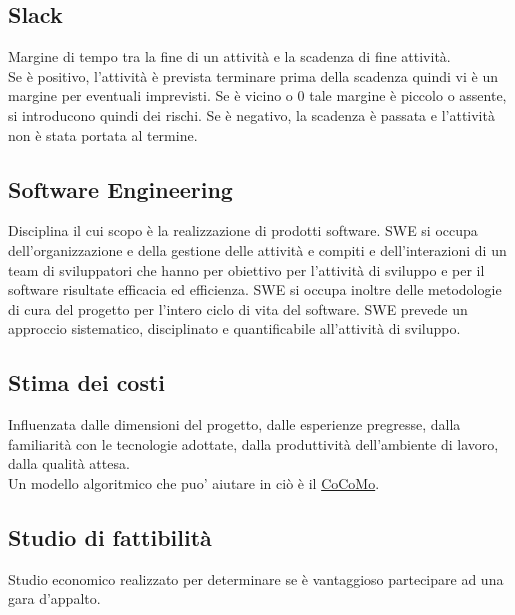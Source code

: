 	\subsection{Slack}
	\label{sec:slack}
	Margine di tempo tra la fine di un attività e la scadenza di fine attività. \\
	Se è positivo, l'attività è prevista terminare prima della scadenza quindi vi è un margine per eventuali imprevisti. Se è vicino o 0 tale margine è piccolo o assente, si introducono quindi dei rischi. Se è negativo, la scadenza è passata e l'attività non è stata portata al termine.
	
	\subsection{Software Engineering}
	\label{sec:swe}
	Disciplina il cui scopo è la realizzazione di prodotti software.
	SWE si occupa dell'organizzazione e della gestione delle attività e compiti e dell'interazioni di un team di sviluppatori
	che hanno per obiettivo per l'attività di sviluppo e per il software risultate efficacia ed efficienza.	
	SWE si occupa inoltre delle metodologie di cura del progetto per l'intero ciclo di vita del software.
	SWE prevede un approccio sistematico, disciplinato e quantificabile all'attività di sviluppo.

	\subsection{Stima dei costi}
	\label{sec:stimacosti}
	Influenzata dalle dimensioni del progetto, dalle esperienze pregresse, dalla familiarità con le tecnologie adottate, dalla produttività dell'ambiente di lavoro, dalla qualità attesa. \\Un modello algoritmico che puo' aiutare in ciò è il \hyperref[sec:cocomo]{CoCoMo}.

	\subsection{Studio di fattibilità}
	\label{sec:studiofattibilita}
	Studio economico realizzato per determinare se è vantaggioso partecipare ad una gara d'appalto.\newpage

